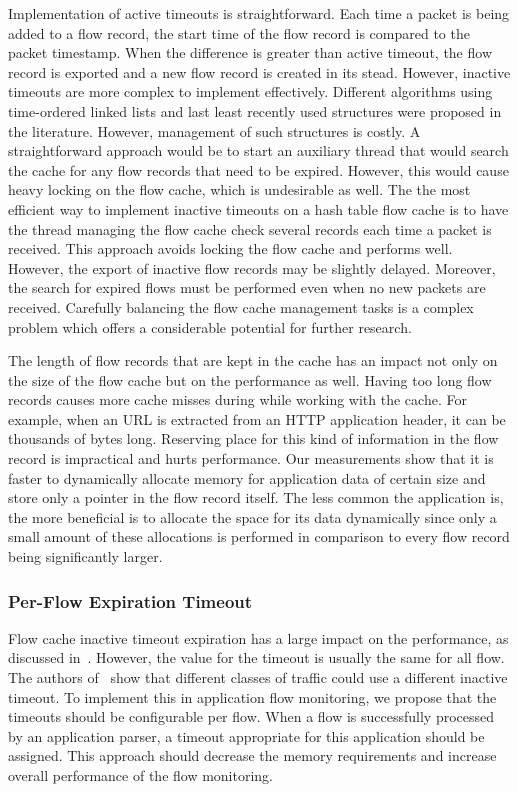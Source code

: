 Implementation of active timeouts is straightforward. Each time a packet is being added to a flow record, the start time of the flow record is compared to the packet timestamp. When the difference is greater than active timeout, the flow record is exported and a new flow record is created in its stead. However, inactive timeouts are more complex to implement effectively. Different algorithms using time-ordered linked lists and last least recently used structures were proposed in the literature. However, management of such structures is costly. A straightforward approach would be to start an auxiliary thread that would search the cache for any flow records that need to be expired. However, this would cause heavy locking on the flow cache, which is undesirable as well. The the most efficient way to implement inactive timeouts on a hash table flow cache is to have the thread managing the flow cache check several records each time a packet is received. This approach avoids locking the flow cache and performs well. However, the export of inactive flow records may be slightly delayed. Moreover, the search for expired flows must be performed even when no new packets are received. Carefully balancing the flow cache management tasks is a complex problem which offers a considerable potential for further research.

The length of flow records that are kept in the cache has an impact not only on the size of the flow cache but on the performance as well. Having too long flow records causes more cache misses during while working with the cache. For example, when an URL is extracted from an HTTP application header, it can be thousands of bytes long. Reserving place for this kind of information in the flow record is impractical and hurts performance. Our measurements show that it is faster to dynamically allocate memory for application data of certain size and store only a pointer in the flow record itself. The less common the application is, the more beneficial is to allocate the space for its data dynamically since only a small amount of these allocations is performed in comparison to every flow record being significantly larger.

\subsubsection{Per-Flow Expiration Timeout}

Flow cache inactive timeout expiration has a large impact on the performance, as discussed in~\cite{Rodriguez-2013-Empirical, Molina-2006-Design}. However, the value for the timeout is usually the same for all flow. The authors of~\cite{Rodriguez-2013-Empirical} show that different classes of traffic could use a different inactive timeout. To implement this in application flow monitoring, we propose that the timeouts should be configurable per flow. When a flow is successfully processed by an application parser, a timeout appropriate for this application should be assigned. This approach should decrease the memory requirements and increase overall performance of the flow monitoring.

